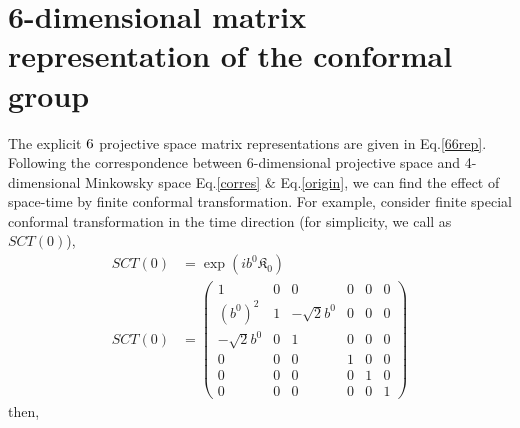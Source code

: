 \documentclass[aps,reprint,notitlepage,nofootinbib,superscriptaddress]{revtex4-1}
\begin{document}
\section{6-dimensional matrix representation of the conformal group} 
\label{egSCT0}
The explicit $6\time6$ projective space matrix representations are given in Eq.\eqref{66rep}. Following the correspondence between 6-dimensional projective space and 4-dimensional Minkowsky space Eq.\eqref{corres} $\&$ Eq.\eqref{origin}, we can find the effect of space-time by finite conformal transformation. For example, consider finite special conformal transformation in the time direction (for simplicity, we call as $SCT(0)$),
\begin{align}
      SCT(0)&=\exp({ib^0\mathfrak{K}_0})\\
    SCT(0)&=\begin{pmatrix}
    1&0&0&0&0&0\\
    (b^0)^2&1&-\sqrt{2}b^0&0&0&0\\
    -\sqrt{2}b^0&0&1&0&0&0\\
    0&0&0&1&0&0\\
    0&0&0&0&1&0\\
    0&0&0&0&0&1
    \end{pmatrix}
  \end{align}
then,
\end{document}
